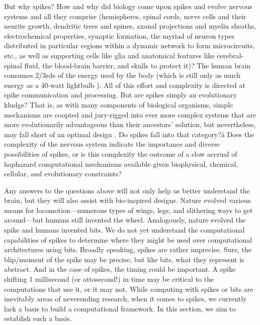 But why spikes?
How and why did biology come upon spikes and evolve nervous systems and all they comprise (hemispheres, spinal cords, nerve cells and their neurite growth, dendritic trees and spines, axonal projections and myelin sheaths, electrochemical properties, synaptic formation, the myriad of neuron types distributed in particular regions within a dynamic network to form microcircuits, etc., as well as supporting cells like glia and anatomical features like cerebral-spinal fluid, the blood-brain barrier, and skulls to protect it)?
The human brain consumes 2/3rds of the energy used by the body \cite{TODO} (which is still only as much energy as a 40-watt lightbulb \cite{TODO}).
All of this effort and complexity is directed at spike communication and processing.
But are spikes simply an evolutionary kludge?
That is, as with many components of biological organisms, simple mechanisms are coopted and jury-rigged into ever more complex systems that are more evolutionarily advantageous than their ancestors' solution, but nevertheless, may fall short of an optimal design \cite{dawkinsBlindWatchmakerWhy2015}.
Do spikes fall into that category?å
Does the complexity of the nervous system indicate the importance and diverse possibilities of spikes, or is this complexity the outcome of a slow accrual of haphazard computational mechanisms available given biophysical, chemical, cellular, and evolutionary constraints?

Any answers to the questions above will not only help us better understand the brain, but they will also assist with bio-inspired designs. 
Nature evolved various means for locomotion---numerous types of wings, legs, and slithering ways to get around---but humans still invented the wheel.
Analogously, nature evolved the spike and humans invented bits.
We do not yet understand the computational capabilities of spikes to determine where they might be used over computational architectures using bits.
Broadly speaking, spikes are rather imprecise.
Sure, the blip/moment of the spike may be precise, but like bits, what they represent is abstract.
And in the case of spikes, the timing could be important.
A spike shifting 1 millisecond (or attosecond!) in time may be critical to the computations that use it, or it may not.
While computing with spikes or bits are inevitably areas of neverending research, when it comes to spikes, we currently lack a basis to build a computational framework.
In this section, we aim to establish such a basis.


